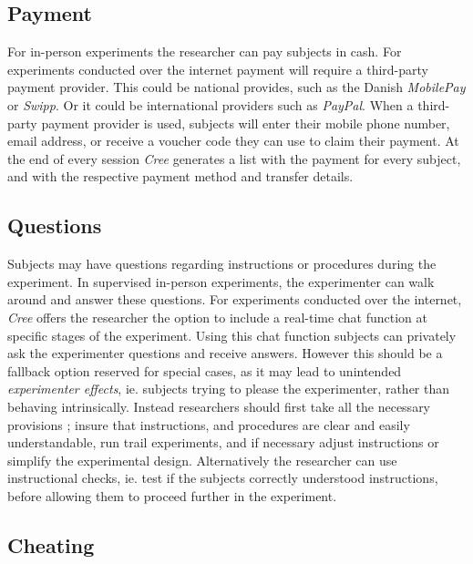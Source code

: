 \documentclass[preprint, 12pt]{elsarticle}
\newcommand{\Cree}{\emph{Cree}\xspace}
\begin{document}
\subsection{Payment}

For in-person experiments the researcher can pay subjects in cash. For experiments conducted over the internet payment will require a third-party payment provider. This could be national provides, such as the Danish \emph{MobilePay} or \emph{Swipp}. Or it could be international providers such as \emph{PayPal}. When a third-party payment provider is used, subjects will enter their mobile phone number, email address, or receive a voucher code they can use to claim their payment. At the end of every session \Cree generates a list with the payment for every subject, and with the respective payment method and transfer details.

\subsection{Questions}

Subjects may have questions regarding instructions or procedures during the experiment. In supervised in-person experiments, the experimenter can walk around and answer these questions. For experiments conducted over the internet, \Cree offers the researcher the option to include a real-time chat function at specific stages of the experiment. Using this chat function subjects can privately ask the experimenter questions and receive answers. However this should be a fallback option reserved for special cases, as it may lead to unintended \emph{experimenter effects}, ie. subjects trying to please the experimenter, rather than behaving intrinsically. Instead researchers should first take all the necessary provisions \citep{Guala_2005}; insure that instructions, and procedures are clear and easily understandable, run trail experiments, and if necessary adjust instructions or simplify the experimental design. Alternatively the researcher can use instructional checks, ie. test if the subjects correctly understood instructions, before allowing them to proceed further in the experiment.

\subsection{Cheating}
\end{document}
